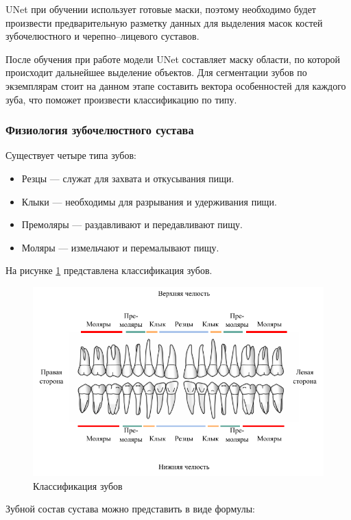UNet при обучении использует готовые маски, поэтому необходимо будет произвести предварительную разметку данных для выделения масок костей зубочелюстного и черепно--лицевого суставов.

После обучения при работе модели UNet составляет маску области, по которой происходит дальнейшее выделение объектов. Для сегментации зубов по экземплярам стоит на данном этапе составить вектора особенностей для каждого зуба, что поможет произвести классификацию по типу.

\subsubsection{Физиология зубочелюстного сустава}

Существует четыре типа зубов:
\begin{itemize}
	\item Резцы --- служат для захвата и откусывания пищи.
	\item Клыки --- необходимы для разрывания и удерживания пищи.
	\item Премоляры --- раздавливают и передавливают пищу.
	\item Моляры --- измельчают и перемалывают пищу.
\end{itemize}

На рисунке \ref{fig:teeth} представлена классификация зубов.

\begin{figure}[H]
	\centering
	\includegraphics[width=\textwidth]{img/teeth.pdf}
	\caption{Классификация зубов}
	\label{fig:teeth}
\end{figure}

Зубной состав сустава можно представить в виде формулы:

